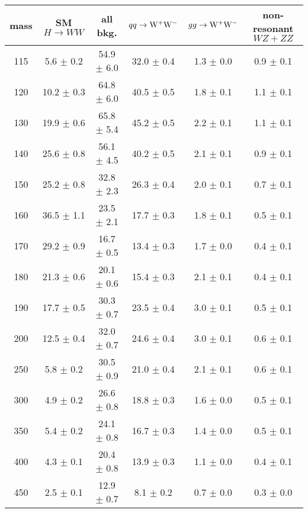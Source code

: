 \begin{table}[!ht]
  \begin{center}
 {\normalsize
  \begin{tabular} {|c|c|c|c|c|c|}
\hline
  mass    & SM $H\to WW$ & all bkg. & $qq \to \mathrm{W}^+\mathrm{W}^-$ & $gg \to \mathrm{W}^+\mathrm{W}^-$ & non-resonant $WZ+ZZ$ \\
  \hline
  \hline
115 &    5.6 $\pm$   0.2 &  54.9	 $\pm$    6.0  &  32.0 $\pm$   0.4 &   1.3 $\pm$   0.0 &   0.9 $\pm$   0.1 \\
120 &   10.2 $\pm$   0.3 &  64.8	 $\pm$    6.0  &  40.5 $\pm$   0.5 &   1.8 $\pm$   0.1 &   1.1 $\pm$   0.1 \\
130 &   19.9 $\pm$   0.6 &  65.8	 $\pm$    5.4  &  45.2 $\pm$   0.5 &   2.2 $\pm$   0.1 &   1.1 $\pm$   0.1 \\
140 &   25.6 $\pm$   0.8 &  56.1	 $\pm$    4.5  &  40.2 $\pm$   0.5 &   2.1 $\pm$   0.1 &   0.9 $\pm$   0.1 \\
150 &   25.2 $\pm$   0.8 &  32.8	 $\pm$    2.3  &  26.3 $\pm$   0.4 &   2.0 $\pm$   0.1 &   0.7 $\pm$   0.1 \\
160 &   36.5 $\pm$   1.1 &  23.5	 $\pm$    2.1  &  17.7 $\pm$   0.3 &   1.8 $\pm$   0.1 &   0.5 $\pm$   0.1 \\
170 &   29.2 $\pm$   0.9 &  16.7	 $\pm$    0.5  &  13.4 $\pm$   0.3 &   1.7 $\pm$   0.0 &   0.4 $\pm$   0.1 \\
180 &   21.3 $\pm$   0.6 &  20.1	 $\pm$    0.6  &  15.4 $\pm$   0.3 &   2.1 $\pm$   0.1 &   0.4 $\pm$   0.1 \\
190 &   17.7 $\pm$   0.5 &  30.3	 $\pm$    0.7  &  23.5 $\pm$   0.4 &   3.0 $\pm$   0.1 &   0.5 $\pm$   0.1 \\
200 &   12.5 $\pm$   0.4 &  32.0	 $\pm$    0.7  &  24.6 $\pm$   0.4 &   3.0 $\pm$   0.1 &   0.6 $\pm$   0.1 \\
250 &    5.8 $\pm$   0.2 &  30.5	 $\pm$    0.9  &  21.0 $\pm$   0.4 &   2.1 $\pm$   0.1 &   0.6 $\pm$   0.1 \\
300 &    4.9 $\pm$   0.2 &  26.6	 $\pm$    0.8  &  18.8 $\pm$   0.3 &   1.6 $\pm$   0.0 &   0.5 $\pm$   0.1 \\
350 &    5.4 $\pm$   0.2 &  24.1	 $\pm$    0.8  &  16.7 $\pm$   0.3 &   1.4 $\pm$   0.0 &   0.5 $\pm$   0.1 \\
400 &    4.3 $\pm$   0.1 &  20.4	 $\pm$    0.8  &  13.9 $\pm$   0.3 &   1.1 $\pm$   0.0 &   0.4 $\pm$   0.1 \\
450 &    2.5 $\pm$   0.1 &  12.9	 $\pm$    0.7  &   8.1 $\pm$   0.2 &   0.7 $\pm$   0.0 &   0.3 $\pm$   0.0 \\

\end{tabular}}
\end{center}
\end{table}
